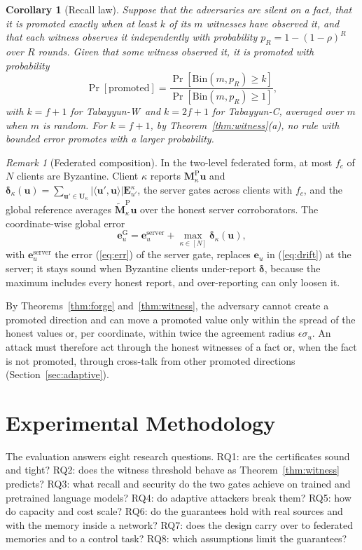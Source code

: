 \documentclass[journal]{IEEEtran}
\newtheorem{corollary}{Corollary}
\theoremstyle{remark}
\newtheorem{remark}{Remark}
\newcommand{\TabC}{\mbox{Tabayyun-C}}
\newcommand{\TabW}{\mbox{Tabayyun-W}}
\newcommand{\Mp}{\bm{M}^{\mathrm{P}}}
\newcommand{\Mpref}{\widetilde{\bm{M}}^{\mathrm{P}}}
\begin{document}
\begin{corollary}[Recall law]\label{cor:recall}
Suppose that the adversaries are silent on a fact, that it is promoted exactly when at least $k$ of its $m$ witnesses have observed it, and that each witness observes it independently with probability $p_R=1-(1-\rho)^R$ over $R$ rounds. Given that some witness observed it, it is promoted with probability
\begin{equation}\label{eq:recall}
\Pr[\mathrm{promoted}]=\frac{\Pr[\mathrm{Bin}(m,p_R)\ge k]}{\Pr[\mathrm{Bin}(m,p_R)\ge 1]},
\end{equation}
with $k=f+1$ for \TabW\ and $k=2f+1$ for \TabC, averaged over $m$ when $m$ is random. For $k=f+1$, by Theorem~\ref{thm:witness}(a), no rule with bounded error promotes with a larger probability.
\end{corollary}

\begin{remark}[Federated composition]
In the two-level federated form, at most $f_c$ of $N$ clients are Byzantine. Client $\kappa$ reports $\Mp_\kappa\bm{u}$ and $\bm{\delta}_\kappa(\bm{u})=\sum_{\bm{u}'\in\bm{U}_\kappa}|\langle\bm{u}',\bm{u}\rangle|\bm{E}^\kappa_{u'}$, the server gates across clients with $f_c$, and the global reference averages $\Mpref_\kappa\bm{u}$ over the honest server corroborators. The coordinate-wise global error
\begin{equation}\label{eq:fed}
\bm{e}^{\mathrm{G}}_u=\bm{e}^{\mathrm{server}}_u+\max_{\kappa\in[N]}\bm{\delta}_\kappa(\bm{u}),
\end{equation}
with $\bm{e}^{\mathrm{server}}_u$ the error (\ref{eq:err}) of the server gate, replaces $\bm{e}_u$ in (\ref{eq:drift}) at the server; it stays sound when Byzantine clients under-report $\bm{\delta}$, because the maximum includes every honest report, and over-reporting can only loosen it.
\end{remark}

By Theorems~\ref{thm:forge} and~\ref{thm:witness}, the adversary cannot create a promoted direction and can move a promoted value only within the spread of the honest values or, per coordinate, within twice the agreement radius $\epsilon\sigma_u$. An attack must therefore act through the honest witnesses of a fact or, when the fact is not promoted, through cross-talk from other promoted directions (Section~\ref{sec:adaptive}).

\section{Experimental Methodology}\label{sec:setup}
The evaluation answers eight research questions. RQ1: are the certificates sound and tight? RQ2: does the witness threshold behave as Theorem~\ref{thm:witness} predicts? RQ3: what recall and security do the two gates achieve on trained and pretrained language models? RQ4: do adaptive attackers break them? RQ5: how do capacity and cost scale? RQ6: do the guarantees hold with real sources and with the memory inside a network? RQ7: does the design carry over to federated memories and to a control task? RQ8: which assumptions limit the guarantees?
\end{document}
